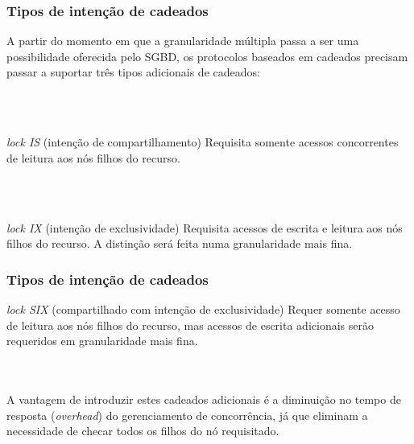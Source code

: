 \documentclass{beamer}
\begin{document}
    
\begin{frame}
    \frametitle{Tipos de intenção de cadeados}
    
    A partir do momento em que a granularidade múltipla passa a ser uma possibilidade oferecida pelo SGBD, os protocolos baseados em cadeados precisam passar a suportar três tipos adicionais de cadeados:
    
    \\~\\
    \begin{block}{\emph{lock IS} (intenção de compartilhamento)}
        Requisita somente acessos concorrentes de leitura aos nós filhos do recurso.
    \end{block}

    \\~\\
    \begin{block}{\emph{lock IX} (intenção de exclusividade)}
        Requisita acessos de escrita e leitura aos nós filhos do recurso. A distinção será feita numa granularidade mais fina.
    \end{block}

\end{frame}

\begin{frame}
    \frametitle{Tipos de intenção de cadeados}

    \begin{block}{\emph{lock SIX} (compartilhado com intenção de exclusividade)}
        Requer somente acesso de leitura aos nós filhos do recurso, mas acessos de escrita adicionais serão requeridos em granularidade mais fina. 
    \end{block}
    
    \\~\\ A vantagem de introduzir estes cadeados adicionais é a diminuição no tempo de resposta (\emph{overhead}) do gerenciamento de concorrência, já que eliminam a necessidade de checar todos os filhos do nó requisitado.
    
\end{frame}
    
    
\end{document}
